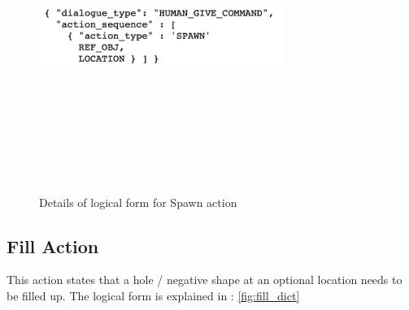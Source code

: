 \begin{figure}[h]
    \centering
    \includegraphics[width=8cm,height=10cm,keepaspectratio]{figures/spawn.png}
    \caption{Details of logical form for Spawn action}
    \label{fig:spawn_dict}
\end{figure}


\subsection{ Fill Action}
This action states that a hole / negative shape at an optional location needs to be filled up. The logical form  is explained in : \ref{fig:fill_dict}

